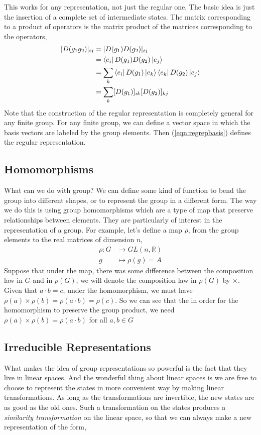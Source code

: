 This works for any representation, not just the regular one. The basic idea is just the insertion of a complete set of intermediate states. The matrix corresponding to a product of operators is the matrix product of the matrices corresponding to the operators, 
\begin{equation}
\begin{split}
    [D(g_1g_2)]_{ij} &=[D(g_1)D(g_2)]_{ij}\\
    &= \bra{e_i}D(g_1)D(g_2)\ket{e_j}\\
    &= \sum_{k}\bra{e_i}D(g_1)\ket{e_k}\bra{e_k}D(g_2)\ket{e_j}\\
    &=\sum_{k}[D(g_1)]_{ik}[D(g_2)]_{kj}
\end{split}
\end{equation}
Note that the construction of the regular representation is completely general for any finite group. For any finite group, we can define a vector space in which the basis vectors are labeled by the group elements. Then (\ref{eqn:regrepbasis}) defines the regular representation.

\subsection{Homomorphisms}
What can we do with group? We can define some kind of function to bend the group into different shapes, or to represent the group in a different form. The way we do this is using group homomorphisms which are a type of map that preserve relationships between elements. They are particularly of interest in the representation of a group. For example, let's define a map $\rho$, from the group elements to the real matrices of dimension $n$,
\begin{equation}
\begin{split}
    \rho : G &\rightarrow GL(n, \mathbb{R}) \\
    g  &\mapsto \rho(g) = A
\end{split}
\end{equation} 
Suppose that under the map, there was some difference between the composition law in $G$ and in $\rho(G)$, we will denote the composition law in $\rho(G)$ by $\times$.
Given that $a\cdot b = c$, under the homomorphism, we must have $\rho(a)\times \rho(b) = \rho(a\cdot b) = \rho(c)$. So we can see that the in order for the homomorphism to preserve the group product, we need $\rho(a)\times \rho(b) = \rho(a\cdot b)$ for all $a,b\in G$

\subsection{Irreducible Representations}
What makes the idea of group representations so powerful is the fact that they live in linear spaces. And the wonderful thing about linear spaces is we are free to choose to represent the states in more convenient way by making linear transformations. As long as the transformations are invertible, the new states are as good as the old ones. Such a transformation on the states produces a \textit{similarity transformation} on the linear space, so that we can always make a new representation of the form, 


